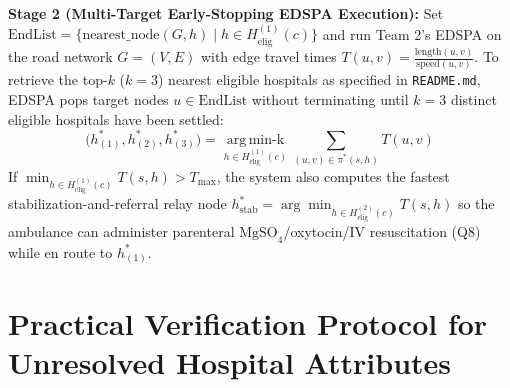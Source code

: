 \documentclass[10pt,a4paper]{article}
\begin{document}
\textbf{Stage 2 (Multi-Target Early-Stopping EDSPA Execution):}
Set $\text{EndList} = \{ \text{nearest\_node}(G, h) \mid h \in H_{\text{elig}}^{(1)}(c) \}$ and run Team 2's EDSPA on the road network $G = (V, E)$ with edge travel times $T(u, v) = \frac{\text{length}(u,v)}{\text{speed}(u,v)}$. To retrieve the top-$k$ ($k=3$) nearest eligible hospitals as specified in \texttt{README.md}, EDSPA pops target nodes $u \in \text{EndList}$ without terminating until $k=3$ distinct eligible hospitals have been settled:
\begin{equation}
    \bigl(h_{(1)}^*, h_{(2)}^*, h_{(3)}^*\bigr) = \operatorname*{arg\,min\text{-}k}_{h \in H_{\text{elig}}^{(1)}(c)} \sum_{(u,v) \in \pi^*(s, h)} T(u, v)
\end{equation}
If $\min_{h \in H_{\text{elig}}^{(1)}(c)} T(s, h) > T_{\max}$, the system also computes the fastest stabilization-and-referral relay node $h_{\text{stab}}^* = \arg\min_{h \in H_{\text{elig}}^{(2)}(c)} T(s, h)$ so the ambulance can administer parenteral $\text{MgSO}_4$/oxytocin/IV resuscitation (Q8) while en route to $h_{(1)}^*$.

\section{Practical Verification Protocol for Unresolved Hospital Attributes}
\end{document}
